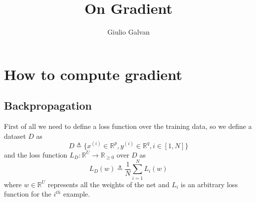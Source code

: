 \documentclass{article}
\title{On Gradient}
\author{Giulio Galvan}
\begin{document}
\maketitle

\begin{abstract}
\end{abstract}

\section{How to compute gradient}
\subsection{Backpropagation}

First of all we need to define a loss function over the training data, so we define a dataset $D$ as 
\begin{equation}
D\triangleq\{x^{(i)} \in \mathbb{R}^p, y^{(i)} \in \mathbb{R}^q,  i\in[1,N]\}
\end{equation}
and the loss function $L_D:\mathbb{R}^U \rightarrow \mathbb{R}_{\geq 0}$ over $D$ as
\begin{equation}
L_D(w)\triangleq\frac{1}{N}\sum_{i=1}^N L_i(w) 
\end{equation}
where $w\in \mathbb{R}^U$ represents all the weights of the net and $L_i$ is an arbitrary loss function for the $i^{th}$ example.
\end{document}
